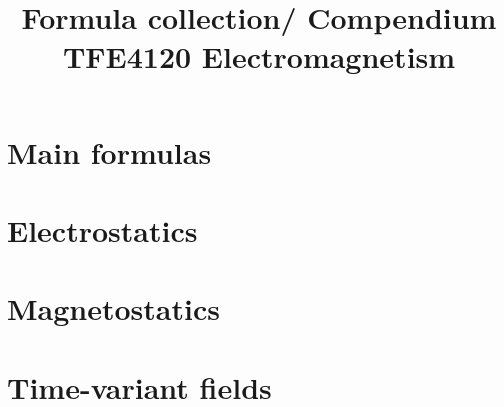 

\title{Formula collection/ Compendium \\ TFE4120 Electromagnetism}





    

    \section{Main formulas}
    

    \section{Electrostatics}
    

    \section{Magnetostatics}
    

    \section{Time-variant fields}
    

